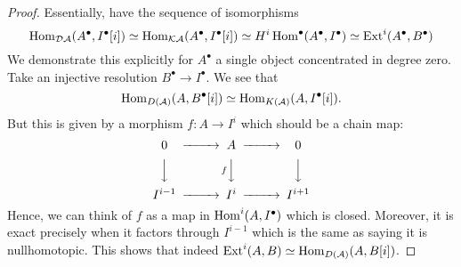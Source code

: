 \begin{proof}
    Essentially, have the sequence of isomorphisms $$\operatorname{Hom}_{\mathcal{D} \mathcal{A}}(A^\bullet, I^\bullet[i])\simeq \operatorname{Hom}_{\mathcal{K} \mathcal{A}}(A^\bullet, I^\bullet[i])\simeq H^i \operatorname{Hom}^\bullet(A^\bullet, I^\bullet)\simeq \operatorname{Ext}^i(A^\bullet, B^\bullet)$$
    We demonstrate this explicitly for $A^\bullet$ a single object concentrated in degree zero. Take an injective resolution $B^\bullet \to I^\bullet$. We see that
\begin{equation*}
    \operatorname{Hom}_{D(\mathcal{A})}(A,B^\bullet[i]) \simeq \operatorname{Hom}_{K(\mathcal{A})}(A,I^\bullet[i]).
\end{equation*}
But this is given by a morphism $f:A\to I^i$ which should be a chain map:
\begin{equation*}
    \begin{CD}
        0 @>>> A @>>> 0 \\
          @VVV @VfVV @VVV \\
        I^{i-1} @>>> I^i @>>> I^{i+1}
    \end{CD}
\end{equation*}
Hence, we can think of $f$ as a map in $\operatorname{Hom}^i(A, I^\bullet)$ which is closed. Moreover, it is exact precisely when it factors through $I^{i-1}$ which is the same as saying it is nullhomotopic. This shows that indeed $\operatorname{Ext}^i(A,B)\simeq\operatorname{Hom}_{D(\mathcal{A})}(A,B[i])$.
\end{proof}


%





